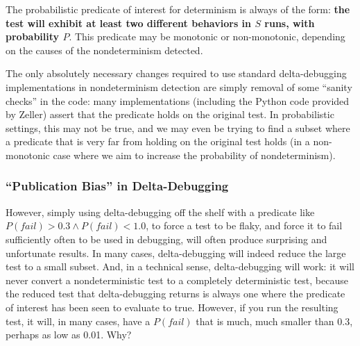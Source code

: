 The probabilistic predicate of interest for determinism is always of
the form:  {\bf the test will exhibit at least two different behaviors in $S$
runs, with probability $P$}.  This predicate may be monotonic or
non-monotonic, depending on the causes of the nondeterminism detected.

The only absolutely necessary changes required to use standard
delta-debugging implementations in nondeterminism detection
are simply removal of some ``sanity checks'' in the code:  many
implementations (including the Python code provided by Zeller) assert
that the predicate holds on the original test.  In probabilistic
settings, this may not be true, and we may even be trying to find a
subset where a predicate that is very far from holding on the original test
holds (in a non-monotonic case where we aim to increase the probability
of nondeterminism).

\subsubsection{``Publication Bias'' in Delta-Debugging}

However, simply using delta-debugging off the shelf with a predicate
like $P(fail) > 0.3 \wedge P(fail) < 1.0$, to force a test to be flaky, and force it to fail
sufficiently often to be used in debugging, will often produce
surprising and unfortunate results.  In many cases,
delta-debugging will indeed reduce the large test to a small subset.
And, in a technical sense, delta-debugging will work:  it will never
convert a nondeterministic test to a completely deterministic test,
because the reduced test that delta-debugging returns is always one
where the predicate of interest has been seen to evaluate to true.
However, if you run the resulting test, it will, in many cases, have a
$P(fail)$ that is much, much smaller than
0.3, perhaps as low as 0.01.  Why?

